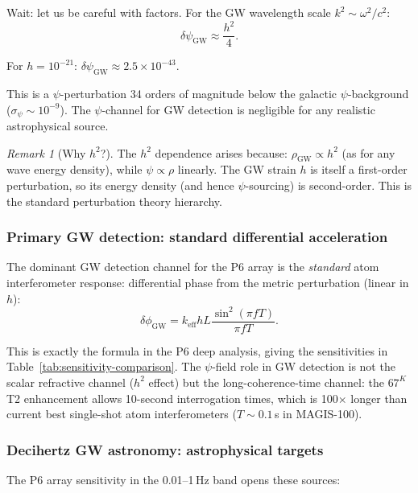 \documentclass[11pt]{article}
\theoremstyle{definition}
\theoremstyle{remark}
\newtheorem{remark}[theorem]{Remark}
\begin{document}
Wait: let us be careful with factors. For the GW wavelength scale
$k^2 \sim \omega^2/c^2$:
\begin{equation}
\boxed{\delta\psi_{\mathrm{GW}} \approx \frac{h^2}{4}.}
\label{eq:gw-psi-coupling}
\end{equation}

For $h = 10^{-21}$:
$\delta\psi_{\mathrm{GW}} \approx 2.5\times10^{-43}$.

This is a $\psi$-perturbation 34 orders of magnitude below the galactic
$\psi$-background ($\sigma_\psi \sim 10^{-9}$). The $\psi$-channel for
GW detection is negligible for any realistic astrophysical source.

\begin{remark}[Why $h^2$?]
The $h^2$ dependence arises because: $\rho_{\mathrm{GW}} \propto h^2$
(as for any wave energy density), while $\psi \propto \rho$ linearly.
The GW strain $h$ is itself a first-order perturbation, so its energy
density (and hence $\psi$-sourcing) is second-order. This is the
standard perturbation theory hierarchy.
\end{remark}

\subsubsection{Primary GW detection: standard differential acceleration}

The dominant GW detection channel for the P6 array is the
\emph{standard} atom interferometer response: differential phase from
the metric perturbation (linear in $h$):
\begin{equation}
\delta\phi_{\mathrm{GW}} = k_{\mathrm{eff}} h L
\frac{\sin^2(\pi f T)}{\pi f T}.
\end{equation}

This is exactly the formula in the P6 deep analysis, giving the
sensitivities in Table~\ref{tab:sensitivity-comparison}. The $\psi$-field
role in GW detection is not the scalar refractive channel ($h^2$ effect)
but the long-coherence-time channel: the $67^K$ T2 enhancement allows
10-second interrogation times, which is 100$\times$ longer than current
best single-shot atom interferometers ($T \sim 0.1$\,s in MAGIS-100).

\subsubsection{Decihertz GW astronomy: astrophysical targets}

The P6 array sensitivity in the 0.01--1\,Hz band opens these sources:
\end{document}

